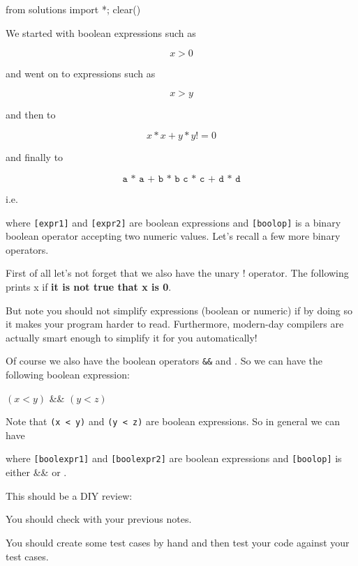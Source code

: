 \begin{python0}
from solutions import *; clear()
\end{python0}

We started with boolean expressions such as

\[x > 0\]

and went on to expressions such as

\[x > y\]

and then to

\[x * x + y * y != 0\]

and finally to

\[\texttt{a * a + b * b  c * c + d * d}\]

i.e.
\begin{center}
\EMPHASIZE{\texttt{[expr1] [boolop] [expr2]}}
\end{center}
where \texttt{[expr1]} and \texttt{[expr2]} are boolean expressions
and \texttt{[boolop]} is a binary boolean operator accepting two
numeric values. Let's recall a few more binary operators.

First of all let's not forget that we also have the unary ! operator. The following prints x if \textbf{it is not true that x is 0}.


But note you should not simplify expressions (boolean or numeric) if by
doing so it makes your program harder to read. Furthermore, modern-day
compilers are actually smart enough to simplify it for you
automatically!

Of course we also have the boolean operators \texttt{\&\&} and
\texttt{\textbar\textbar}. So we can have the following boolean
expression:
\begin{center}
$(x < y)$   \&\&  $(y < z)$
\end{center}
Note that \texttt{(x < y)} and \texttt{(y < z)} are
boolean expressions. So in general we can have
\begin{center}
\EMPHASIZE{\texttt{[boolexpr1] [boolop] [boolexpr2]}}
\end{center}
where \texttt{[boolexpr1]} and \texttt{[boolexpr2]} are boolean
expressions and \texttt{[boolop]} is either \&\& or \textbar\textbar.

This should be a DIY review:


You should check with your previous notes.

You should create some test cases by hand and then test your code
against your test cases.

